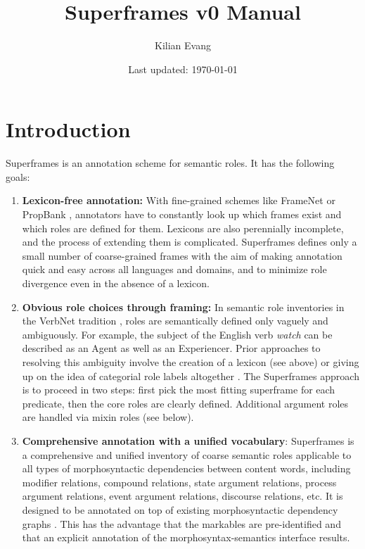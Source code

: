 \documentclass[a4paper]{article}
\title{Superframes v0 Manual}
\author{Kilian Evang}
\date{Last updated: \today}
\begin{document}
\maketitle

\tableofcontents


\clearpage
\section{Introduction}

Superframes is an annotation scheme for semantic roles. It has the following goals:

\begin{enumerate}
    \item \textbf{Lexicon-free annotation:} With fine-grained schemes like FrameNet \citep{baker-etal-1998-berkeley-framenet} or PropBank \citep{palmer-etal-2005-proposition}, annotators have to constantly look up which frames exist and which roles are defined for them. Lexicons are also perennially incomplete, and the process of extending them is complicated. Superframes defines only a small number of coarse-grained frames with the aim of making annotation quick and easy across all languages and domains, and to minimize role divergence even in the absence of a lexicon.
    \item \textbf{Obvious role choices through framing:} In semantic role inventories in the VerbNet tradition \citep{kipper-schuler-2005-verbnet}, roles are semantically defined only vaguely and ambiguously. For example, the subject of the English verb \emph{watch} can be described as an Agent as well as an Experiencer. Prior approaches to resolving this ambiguity involve the creation of a lexicon (see above) or giving up on the idea of categorial role labels altogether \citep{white-etal-2016-universal}. The Superframes approach is to proceed in two steps: first pick the most fitting superframe for each predicate, then the core roles are clearly defined. Additional argument roles are handled via mixin roles (see below).
    \item \textbf{Comprehensive annotation with a unified vocabulary}: Superframes is a comprehensive and unified inventory of coarse semantic roles applicable to all types of morphosyntactic dependencies between content words, including modifier relations, compound relations, state argument relations, process argument relations, event argument relations, discourse relations, etc. It is designed to be annotated on top of existing morphosyntactic dependency graphs \citep[e.g., Universal Dependencies; ][]{de-marneffe-etal-2021-universal}. This has the advantage that the markables are pre-identified and that an explicit annotation of the morphosyntax-semantics interface results.

\end{enumerate}
\end{document}
